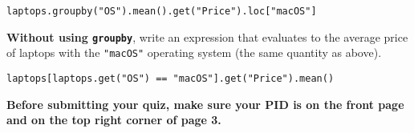 \documentclass[twoside,12pt]{article}
\begin{document}
\begin{probset}
\begin{prob}
\begin{subprobset}
\begin{subprob}
\begin{responsebox}{0.75in}      
   \texttt{laptops.groupby("OS").mean().get("Price").loc["macOS"]}
\end{responsebox}
\end{subprob}
\begin{subprob}
\textbf{Without using \texttt{groupby}}, write an expression that evaluates to the average price of laptops with the \texttt{"macOS"} operating system (the same quantity as above).

\begin{responsebox}{0.75in}
    \texttt{laptops[laptops.get("OS") == "macOS"].get("Price").mean()}
\end{responsebox}
\end{subprob}
\end{subprobset}

\end{prob}

\end{probset}

\newpage

\begin{center}
\textbf{Before submitting your quiz, make sure your PID is on the front page and on the top right corner of page 3.}
\end{center}
\end{document}
